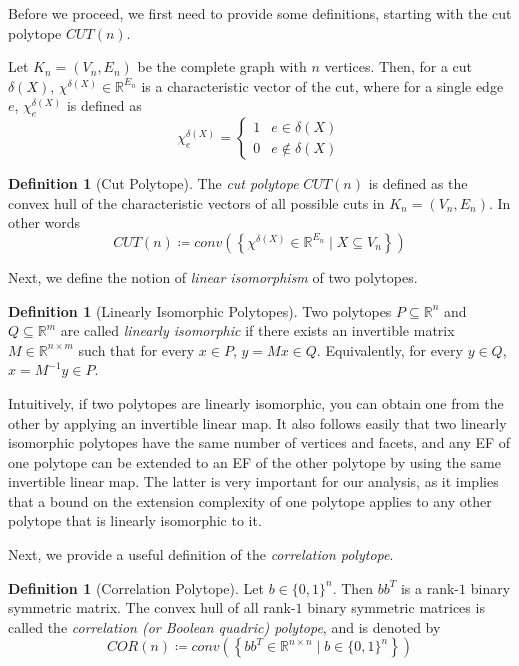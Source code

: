 \documentclass{article}
\theoremstyle{definition}
\newtheorem{definition}[theorem]{Definition}
\theoremstyle{remark}
\renewcommand{\R}{\mathbb{R}}
\begin{document}
Before we proceed, we first need to provide some definitions, starting with the cut polytope $CUT(n)$.

Let $K_n = (V_n, E_n)$ be the complete graph with $n$ vertices. Then, for a cut $\delta(X)$, $\chi^{\delta(X)} \in \R^{E_n}$ is a characteristic vector of the cut, where for a single edge $e$, $\chi^{\delta(X)}_e$ is defined as
\[
\chi^{\delta(X)}_e =
\begin{cases}
1 & e \in \delta(X) \\
0 & e \notin \delta(X)
\end{cases}
\]

\begin{definition}[Cut Polytope]\label{def:cut-poly}
The \textit{cut polytope} $CUT(n)$ is defined as the convex hull of the characteristic vectors of all possible cuts in $K_n = (V_n, E_n)$. In other words
\[
CUT(n) \coloneqq conv\left( \left\{ \chi^{\delta(X)} \in \R^{E_n} \mid X \subseteq V_n \right\} \right)
\]
\end{definition}

Next, we define the notion of \textit{linear isomorphism} of two polytopes.

\begin{definition}[Linearly Isomorphic Polytopes]\label{def:lin-iso}
Two polytopes $P \subseteq \R^n$ and $Q \subseteq \R^m$ are called \textit{linearly isomorphic} if there exists an invertible matrix $M \in \R^{n \times m}$ such that for every $x \in P$, $y = Mx \in Q$. Equivalently, for every $y \in Q$, $x = M^{-1}y \in P$.
\end{definition}

Intuitively, if two polytopes are linearly isomorphic, you can obtain one from the other by applying an invertible linear map. It also follows easily that two linearly isomorphic polytopes have the same number of vertices and facets, and any EF of one polytope can be extended to an EF of the other polytope by using the same invertible linear map. The latter is very important for our analysis, as it implies that a bound on the extension complexity of one polytope applies to any other polytope that is linearly isomorphic to it.

Next, we provide a useful definition of the \textit{correlation polytope}.

\begin{definition}[Correlation Polytope]\label{def:cor}
Let $b \in {\{0, 1\}}^n$. Then $b b^T$ is a rank-$1$ binary symmetric matrix. The convex hull of all rank-$1$ binary symmetric matrices is called
the \textit{correlation (or Boolean quadric) polytope}, and is denoted by
\[
COR(n) \coloneqq conv\left( \left\{ bb^T \in \R^{n \times n} \mid b \in {\{0, 1\}}^n \right\} \right)
\]
\end{definition}
\end{document}
